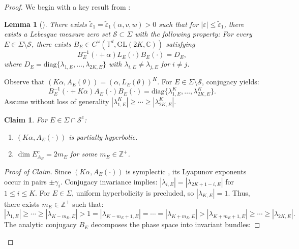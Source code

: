\documentclass[11pt]{amsart}
\newtheorem{lemma}[theorem]{Lemma}
\newtheorem{Claim}{Claim}
\theoremstyle{remark}
\theoremstyle{definition}
\begin{document}
\begin{proof}
    We begin with a key result from \cite{WXYZ}:
    
    \begin{lemma}[{\cite[Theorem 2.3]{WXYZ}}]\label{lem:reduction}
        There exists $\tilde{\varepsilon}_1 = \tilde{\varepsilon}_1(\alpha, v, w) > 0$ such that for $|\varepsilon| \leq \tilde{\varepsilon}_1$, there exists a Lebesgue measure zero set $\mathcal{S} \subset \Sigma$ with the following property: For every $E \in \Sigma \setminus \mathcal{S}$, there exists $B_E \in C^\omega(\mathbb{T}^d, \mathrm{GL}(2K, \mathbb{C}))$ satisfying
        \[
        B_E^{-1}(\cdot + \alpha)L_E(\cdot)B_E(\cdot) = D_E,
        \]
        where $D_E = \mathrm{diag}\{\lambda_{1,E}, \ldots, \lambda_{2K,E}\}$ with $\lambda_{i,E} \neq \lambda_{j,E}$ for $i \neq j$.
    \end{lemma}

    Observe that $(K\alpha, A_E(\theta)) = (\alpha, L_E(\theta))^K$. For $E \in \Sigma \setminus \mathcal{S}$, conjugacy yields:
    \[
    B_E^{-1}(\cdot + K\alpha)A_E(\cdot)B_E(\cdot) = \mathrm{diag}\{\lambda_{1,E}^K, \ldots, \lambda_{2K,E}^K\}.
    \]
    Assume without loss of generality $|\lambda_{1,E}^K| \geq \cdots \geq |\lambda_{2K,E}^K|$.
    \begin{Claim}
        For $E \in \Sigma \cap \mathcal{S}^c$:
        \begin{enumerate}
            \item $(K\alpha, A_E(\cdot))$ is partially hyperbolic.
            \item $\dim E_{A_E}^c = 2m_E$ for some $m_E \in \mathbb{Z}^+$.
        \end{enumerate}
    \end{Claim}

    \begin{proof}[Proof of Claim]
        Since $(K\alpha, A_E(\cdot))$ is symplectic \cite{Puig}, its Lyapunov exponents occur in pairs $\pm \gamma_i$. Conjugacy invariance implies:
      $
        |\lambda_{i,E}| = |\lambda_{2K+1-i,E}| $ for $1 \leq i \leq K.
        $
        For $E \in \Sigma$, uniform hyperbolicity is precluded, so $|\lambda_{K,E}| = 1$. Thus, there exists $m_E\in \mathbb{Z}^+$ such that:
        \begin{equation*}\label{eq:eigen}
            |\lambda_{1,E}| \geq \cdots \geq |\lambda_{K-m_E,E}| > 1 = |\lambda_{K-m_E+1,E}| = \cdots = |\lambda_{K+m_E,E}| > |\lambda_{K+m_E+1,E}| \geq \cdots \geq |\lambda_{2K,E}|.
        \end{equation*}
        The analytic conjugacy $B_E$ decomposes the phase space into invariant bundles:



\end{proof}
\end{proof}
\end{document}
